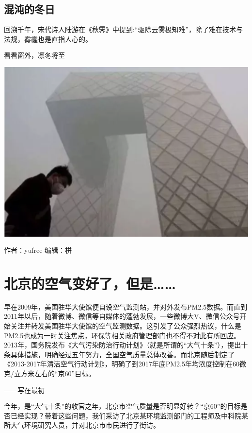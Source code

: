 \documentclass[
]{book}
\begin{document}
\hypertarget{ux6df7ux6c8cux7684ux51acux65e5-1}{%
\subsection{混沌的冬日}\label{ux6df7ux6c8cux7684ux51acux65e5-1}}

回溯千年，宋代诗人陆游在《秋霁》中提到:``驱除云雾极知难''，除了难在技术与法规，雾霾也是直指人心的。

看看窗外，凛冬将至

\includegraphics[width=6.67in]{images/cw5}

作者：yufree
编辑：栟

\hypertarget{ux5317ux4eacux7684ux7a7aux6c14ux53d8ux597dux4e86ux4f46ux662f}{%
\section{北京的空气变好了，但是\ldots\ldots{}}\label{ux5317ux4eacux7684ux7a7aux6c14ux53d8ux597dux4e86ux4f46ux662f}}

早在2009年，美国驻华大使馆便自设空气监测站，并对外发布PM2.5数据。而直到2011年以后，随着微博、微信等自媒体的蓬勃发展，一些微博大V、微信公众号开始关注并转发美国驻华大使馆的空气监测数据。这引发了公众强烈热议，什么是PM2.5也成为一时关注焦点，环保等相关政府管理部门也不得不对此有所回应。2013年，国务院发布《大气污染防治行动计划》（就是所谓的``大气十条''），提出十条具体措施，明确经过五年努力，全国空气质量总体改善。而北京随后制定了《2013-2017年清洁空气行动计划》，明确了到2017年底PM2.5年均浓度控制在60微克/立方米左右的``京60''目标。

------写在最初

今年，是``大气十条''的收官之年，北京市空气质量是否明显好转？``京60''的目标是否已经实现？带着这些问题，我们采访了北京某环境监测部门的工程师及中科院某所大气环境研究人员，并对北京市市民进行了街访。
\end{document}
